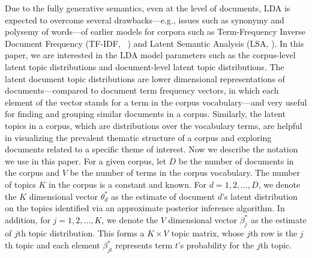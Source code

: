 Due to the fully generative semantics, even at the level of 
documents, LDA is expected to overcome several drawbacks---e.g., 
issues such as synonymy and polysemy of words---of earlier models 
for corpora such as Term-Frequency Inverse Document Frequency 
(TF-IDF, \citeauthor{Salton1975}~\citeyear{Salton1975}) and Latent 
Semantic Analysis (LSA, \citeauthor{Dumais1995} 
\citeyear{Dumais1995}). In this paper, we are interested in the LDA 
model parameters such as the corpus-level latent topic distributions 
and document-level latent topic distributions. The latent document 
topic distributions are lower dimensional representations of 
documents---compared to document term frequency vectors, in which 
each element of the vector stands for a term in the corpus 
vocabulary---and very useful for finding and grouping similar 
documents in a corpus. Similarly, the latent topics in a corpus, 
which are distributions over the vocabulary terms, are helpful in 
visualizing the prevalent thematic structure of a corpus and 
exploring documents related to a specific theme of interest. Now 
we describe the notation we use in this paper. For a given corpus, 
let $D$ be the number of documents in the corpus and $V$ be the 
number of terms in the corpus vocabulary. The number of topics $K$ 
in the corpus is a constant and known. For $d = 1, 2, \ldots, D$, we 
denote the $K$ dimensional vector $\theta_d^{*}$ as the estimate of 
document $d$'s latent distribution on the topics identified via an 
approximate posterior inference algorithm. In addition, for $j = 1, 
2, \ldots, K$, we denote the $V$ dimensional vector $\beta_j^{*}$ as 
the estimate of $j$th topic distribution. This forms a $K \times V$ 
topic matrix, whose $j$th row is the $j$th topic and each element 
$\beta_{jt}^{*}$ represents term $t$'s probability for the 
$j$th topic.   





